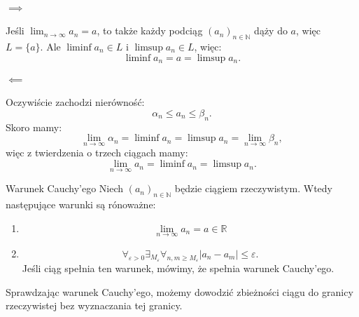 \documentclass{article}
\numberwithin{defi}{section}
\numberwithin{defi}{section}
\newcommand{\R}{\mathbb{R}}
\newcommand{\N}{\mathbb{N}}
\newcommand{\oo}{\infty}
\providecommand{\eps}{\varepsilon}
\newcommand{\ciag}[1]{(#1_{n})_{n \in \N}}
\newcommand{\gras}[2]{\lim_{#1 \to \oo} #2_{#1}}
\begin{document}
\begin{dow}
    \paragraph*{$\implies$} Jeśli $\gras{n}{a} = a$, to także każdy podciąg $\ciag{a}$ dąży do $a$, więc $L = \{ a \}$. Ale $\liminf a_n \in L$ i $\limsup a_n \in L$, więc: \begin{equation}
        \liminf a_n = a = \limsup a_n.
    \end{equation}
    \paragraph*{$\impliedby$} Oczywiście zachodzi nierówność: \begin{equation}
        \alpha_n \leqslant a_n \leqslant \beta_n.
    \end{equation}
    Skoro mamy: \begin{equation}
        \gras{n}{\alpha} = \liminf a_n = \limsup a_n = \gras{n}{\beta},
    \end{equation}
    więc z twierdzenia o trzech ciągach mamy: \begin{equation}
        \gras{n}{a} = \liminf a_n = \limsup a_n.
    \end{equation}
\end{dow}

\begin{twier}{Warunek Cauchy'ego}
    Niech $\ciag{a}$ będzie ciągiem rzeczywistym. Wtedy następujące warunki są rónoważne:
    \begin{enumerate}
        \item \begin{equation}
                  \gras{n}{a} = a \in \R
              \end{equation}
        \item \begin{equation}
                  \forall_{\eps >0} \exists_{M_\eps} \forall_{n, m \geqslant M_\eps} |a_n - a_m| \leqslant \eps.
              \end{equation}
              Jeśli ciąg spełnia ten warunek, mówimy, że spełnia warunek Cauchy'ego.
    \end{enumerate}
\end{twier}

Sprawdzając warunek Cauchy'ego, możemy dowodzić zbieżności ciągu do granicy rzeczywistej bez wyznaczania tej granicy.
\end{document}
